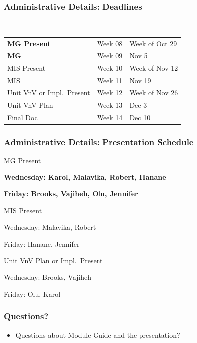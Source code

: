 \documentclass[t, 12pt, numbers, fleqn, handout]{beamer}
\begin{document}

\begin{frame}
\frametitle{Administrative Details: Deadlines}
~\newline
\begin{tabular}{l l l}
\textbf{MG Present} & Week 08 & Week of Oct 29\\
\textbf{MG} & Week 09 & Nov 5\\
MIS Present & Week 10 & Week of Nov 12\\
MIS & Week 11 & Nov 19\\
Unit VnV or Impl.\ Present & Week 12 & Week of Nov 26\\
Unit VnV Plan & Week 13 & Dec 3\\
Final Doc & Week 14 & Dec 10\\
\end {tabular}

\end{frame}


\begin{frame}
\frametitle{Administrative Details: Presentation Schedule}

\bi
\item MG Present
\bi
\item \textbf{Wednesday: Karol, Malavika, Robert, Hanane}
\item \textbf{Friday: Brooks, Vajiheh, Olu, Jennifer}
\ei
\item MIS Present
\bi
\item Wednesday: Malavika, Robert
\item Friday: Hanane,  Jennifer
\ei
\item Unit VnV Plan or Impl.\ Present
\bi
\item Wednesday: Brooks, Vajiheh
\item Friday: Olu, Karol
\ei
\ei

\end{frame}


\begin{frame}
\frametitle{Questions?}
\begin{itemize}
\item Questions about Module Guide and the presentation?
\end{itemize}
\end{frame}
\end{document}
